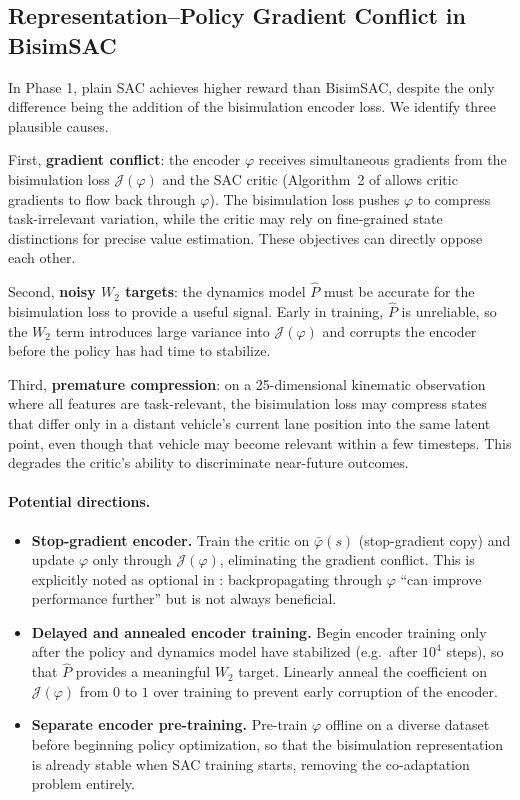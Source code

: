 \documentclass{article}
\begin{document}
\subsection{Representation--Policy Gradient Conflict in BisimSAC}

In Phase 1, plain SAC achieves higher reward than BisimSAC, despite the only
difference being the addition of the bisimulation encoder loss. We identify three
plausible causes.

First, \textbf{gradient conflict}: the encoder $\varphi$ receives simultaneous
gradients from the bisimulation loss $\mathcal{J}(\varphi)$ and the SAC critic
(Algorithm~2 of \citet{zhang2021} allows critic gradients to flow back through
$\varphi$). The bisimulation loss pushes $\varphi$ to compress task-irrelevant
variation, while the critic may rely on fine-grained state distinctions for precise
value estimation. These objectives can directly oppose each other.

Second, \textbf{noisy $W_2$ targets}: the dynamics model $\hat{P}$ must be accurate
for the bisimulation loss to provide a useful signal. Early in training, $\hat{P}$ is
unreliable, so the $W_2$ term introduces large variance into $\mathcal{J}(\varphi)$
and corrupts the encoder before the policy has had time to stabilize.

Third, \textbf{premature compression}: on a 25-dimensional kinematic observation
where all features are task-relevant, the bisimulation loss may compress states that
differ only in a distant vehicle's current lane position into the same latent point,
even though that vehicle may become relevant within a few timesteps. This degrades
the critic's ability to discriminate near-future outcomes.

\paragraph{Potential directions.}
\begin{itemize}[noitemsep]
  \item \textbf{Stop-gradient encoder.} Train the critic on $\bar{\varphi}(s)$
    (stop-gradient copy) and update $\varphi$ only through $\mathcal{J}(\varphi)$,
    eliminating the gradient conflict. This is explicitly noted as optional in
    \citet{zhang2021}: backpropagating through $\varphi$ ``can improve performance
    further'' but is not always beneficial.
  \item \textbf{Delayed and annealed encoder training.} Begin encoder training only
    after the policy and dynamics model have stabilized (e.g.\ after $10^4$ steps),
    so that $\hat{P}$ provides a meaningful $W_2$ target. Linearly anneal the
    coefficient on $\mathcal{J}(\varphi)$ from $0$ to $1$ over training to prevent
    early corruption of the encoder.
  \item \textbf{Separate encoder pre-training.} Pre-train $\varphi$ offline on a
    diverse dataset before beginning policy optimization, so that the bisimulation
    representation is already stable when SAC training starts, removing the
    co-adaptation problem entirely.
\end{itemize}



\newpage



\end{document}
